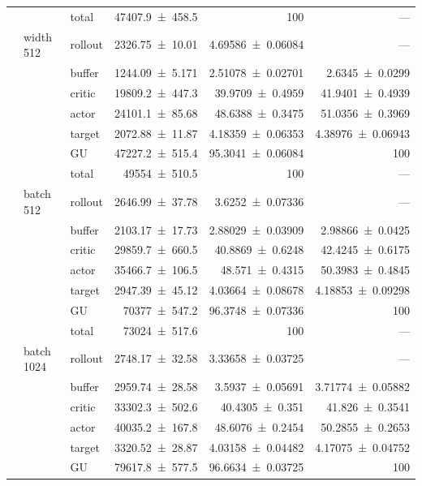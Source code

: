 {\begin{longtable}{@{}lllrrr@{}}
     &  & total & \num{47407.9+-458.5} & \num{100} & --- \\
    \addlinespace[2pt]
     & width 512 & rollout & \num{2326.75+-10.01} & \num{4.69586+-0.06084} & --- \\
     &  & buffer & \num{1244.09+-5.171} & \num{2.51078+-0.02701} & \num{2.6345+-0.0299} \\
     &  & critic & \num{19809.2+-447.3} & \num{39.9709+-0.4959} & \num{41.9401+-0.4939} \\
     &  & actor & \num{24101.1+-85.68} & \num{48.6388+-0.3475} & \num{51.0356+-0.3969} \\
     &  & target & \num{2072.88+-11.87} & \num{4.18359+-0.06353} & \num{4.38976+-0.06943} \\
     &  & GU & \num{47227.2+-515.4} & \num{95.3041+-0.06084} & 100 \\
     &  & total & \num{49554+-510.5} & \num{100} & --- \\
    \addlinespace[2pt]
     & batch 512 & rollout & \num{2646.99+-37.78} & \num{3.6252+-0.07336} & --- \\
     &  & buffer & \num{2103.17+-17.73} & \num{2.88029+-0.03909} & \num{2.98866+-0.0425} \\
     &  & critic & \num{29859.7+-660.5} & \num{40.8869+-0.6248} & \num{42.4245+-0.6175} \\
     &  & actor & \num{35466.7+-106.5} & \num{48.571+-0.4315} & \num{50.3983+-0.4845} \\
     &  & target & \num{2947.39+-45.12} & \num{4.03664+-0.08678} & \num{4.18853+-0.09298} \\
     &  & GU & \num{70377+-547.2} & \num{96.3748+-0.07336} & 100 \\
     &  & total & \num{73024+-517.6} & \num{100} & --- \\
    \addlinespace[2pt]
     & batch 1024 & rollout & \num{2748.17+-32.58} & \num{3.33658+-0.03725} & --- \\
     &  & buffer & \num{2959.74+-28.58} & \num{3.5937+-0.05691} & \num{3.71774+-0.05882} \\
     &  & critic & \num{33302.3+-502.6} & \num{40.4305+-0.351} & \num{41.826+-0.3541} \\
     &  & actor & \num{40035.2+-167.8} & \num{48.6076+-0.2454} & \num{50.2855+-0.2653} \\
     &  & target & \num{3320.52+-28.87} & \num{4.03158+-0.04482} & \num{4.17075+-0.04752} \\
     &  & GU & \num{79617.8+-577.5} & \num{96.6634+-0.03725} & 100 \\

\end{longtable}}
